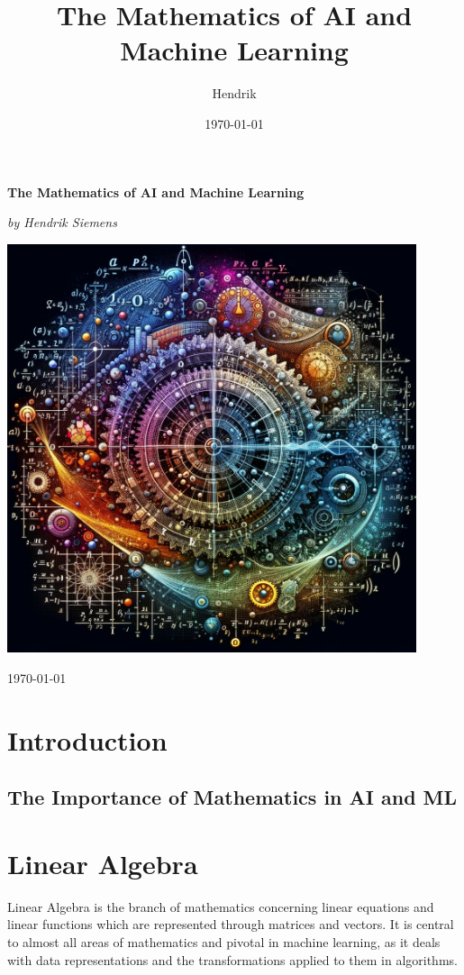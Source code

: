 \documentclass{article}
\title{The Mathematics of AI and Machine Learning}
\author{Hendrik}
\date{\today}
\begin{document}
	
	\begin{titlepage}
		\centering
		\vspace*{1cm}
		
		{\Huge\bfseries The Mathematics of AI and Machine Learning\par}
		\vspace{1.5cm}
		{\Large\itshape by Hendrik Siemens\par} %
		\vfill
		\includegraphics[width=0.9\textwidth]{titel2.png}
		\vfill
		{\Large \today\par}
		\restoregeometry
	\end{titlepage}
	
	\tableofcontents
	\newpage
	
	\section{Introduction}
	\subsection{The Importance of Mathematics in AI and ML}
	
	\section{Linear Algebra}
	Linear Algebra is the branch of mathematics concerning linear equations and linear functions which are represented through matrices and vectors. It is central to almost all areas of mathematics and pivotal in machine learning, as it deals with data representations and the transformations applied to them in algorithms.
	
\end{document}
